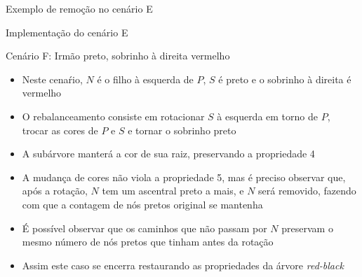 \begin{frame}[fragile]{Exemplo de remoção no cenário E}


\end{frame}

\begin{frame}[fragile]{Implementação do cenário E}
\end{frame}

\begin{frame}[fragile]{Cenário F: Irmão preto, sobrinho à direita vermelho}

    \begin{itemize}
        \item Neste cenaŕio, $N$ é o filho à esquerda de $P$, $S$ é preto e o 
            sobrinho à direita é vermelho

        \item O rebalanceamento consiste em rotacionar $S$ à esquerda em torno de $P$, trocar
            as cores de $P$ e $S$ e tornar o sobrinho preto

        \item A subárvore manterá a cor de sua raiz, preservando a propriedade 4

        \item A mudança de cores não viola a propriedade 5, mas é preciso observar que, após a
            rotação, $N$ tem um ascentral preto a mais, e $N$ será removido, fazendo com que
            a contagem de nós pretos original se mantenha

        \item É possível observar que os caminhos que não passam por $N$ preservam o
            mesmo número de nós pretos que tinham antes da rotação

        \item Assim este caso se encerra restaurando as propriedades da árvore 
            \textit{red-black}
    \end{itemize}

\end{frame}

